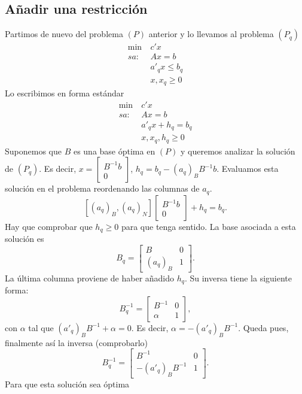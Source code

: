 \documentclass[PM.tex]{subfiles}
\begin{document}
\subsection{Añadir una restricción}
Partimos de nuevo del problema $(P)$ anterior y lo llevamos al problema $(P_q)$
\begin{align*}
\min\ & c'x\\
sa:\  & Ax=b\\
& a'_q x\leq b_q\\
 & x, x_q\geq 0
\end{align*}
Lo escribimos en forma estándar
\begin{align*}
\min\ & c'x\\
sa:\  & Ax=b\\
& a'_q x+h_q= b_q\\
 & x, x_q, h_q\geq 0
\end{align*}
Suponemos que $B$ es una base óptima en $(P)$ y queremos analizar la solución de $(P_q)$. Es decir, $x=\begin{bmatrix}
B^{-1}b\\
0\end{bmatrix}$, $h_q=b_q-(a_q)_B B^{-1}b$.  Evaluamos esta solución en el problema reordenando las columnas de $a_q$.
\[ [(a_q)_B, (a_q)_N]\begin{bmatrix}
B^{-1}b\\
0\end{bmatrix} +h_q=b_q.\] Hay que comprobar que $h_q\geq 0$ para que tenga sentido. La base asociada a esta solución es
\[ B_q=\begin{bmatrix}
B & 0\\
(a_q)_B & 1
\end{bmatrix}.\] La última columna proviene de haber añadido $h_q$. Su inversa tiene la siguiente forma:
\[ B_q^{-1}=\begin{bmatrix}
B^{-1} & 0\\
\alpha & 1
\end{bmatrix},\] con $\alpha$ tal que $(a'_q)_B B^{-1} +\alpha=0$. Es decir, $\alpha=-(a'_q)_B B^{-1}$. Queda pues, finalmente así la inversa (comprobarlo)
\[ B_q^{-1}=\begin{bmatrix}
B^{-1} & 0\\
-(a'_q)_B B^{-1} & 1
\end{bmatrix}.\]
Para que esta solución sea óptima 
\end{document}
